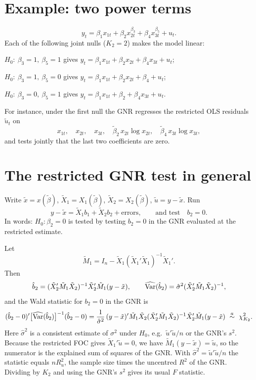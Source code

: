 \documentclass[11pt]{article}
\begin{document}
\section{Example: two power terms}

\[ y_{t}=\beta_{1}x_{1t}+\beta_{2}x_{2t}^{\beta_{3}}+\beta_{4}x_{3t}^{\beta_{5}}+u_{t}. \]
Each of the following joint nulls ($K_{2}=2$) makes the model linear:
\begin{flatlist}
 \item $H_{0}:\ \beta_{3}=1,\ \beta_{5}=1$ \quad gives\quad
       $y_{t}=\beta_{1}x_{1t}+\beta_{2}x_{2t}+\beta_{4}x_{3t}+u_{t}$;
 \item $H_{0}:\ \beta_{3}=1,\ \beta_{5}=0$ \quad gives\quad
       $y_{t}=\beta_{1}x_{1t}+\beta_{2}x_{2t}+\beta_{4}+u_{t}$;
 \item $H_{0}:\ \beta_{3}=0,\ \beta_{5}=1$ \quad gives\quad
       $y_{t}=\beta_{1}x_{1t}+\beta_{2}+\beta_{4}x_{3t}+u_{t}$.
\end{flatlist}
For instance, under the first null the GNR regresses the restricted OLS
residuals $\tilde u_{t}$ on
\[ x_{1t},\quad x_{2t},\quad x_{3t},\quad
   \tilde\beta_{2}\,x_{2t}\log x_{2t},\quad \tilde\beta_{4}\,x_{3t}\log x_{3t}, \]
and tests jointly that the last two coefficients are zero.

\section{The restricted GNR test in general}\label{sec:general}

Write $\tilde x=x(\tilde\beta)$, $\tilde X_{1}=X_{1}(\tilde\beta)$,
$\tilde X_{2}=X_{2}(\tilde\beta)$, $\tilde u=y-\tilde x$. Run
\[ y-\tilde x=\tilde X_{1}b_{1}+\tilde X_{2}b_{2}+\text{errors},
   \qquad\text{and test}\quad b_{2}=0 . \]
In words: $H_{0}:\beta_{2}=0$ is tested by testing $b_{2}=0$ in the GNR evaluated
at the restricted estimate.

Let
\[ \tilde M_{1}=I_{n}-\tilde X_{1}(\tilde X_{1}'\tilde X_{1})^{-1}\tilde X_{1}'. \]
Then
\[ \hat b_{2}=(\tilde X_{2}'\tilde M_{1}\tilde X_{2})^{-1}\tilde X_{2}'\tilde M_{1}(y-\tilde x),
   \qquad
   \widehat{\operatorname{Var}}(\hat b_{2})=\hat\sigma^{2}(\tilde X_{2}'\tilde M_{1}\tilde X_{2})^{-1}, \]
and the Wald statistic for $b_{2}=0$ in the GNR is
\[ (\hat b_{2}-0)'\bigl[\widehat{\operatorname{Var}}(\hat b_{2})\bigr]^{-1}(\hat b_{2}-0)
   =\frac{1}{\hat\sigma^{2}}\,(y-\tilde x)'\tilde M_{1}\tilde X_{2}
     (\tilde X_{2}'\tilde M_{1}\tilde X_{2})^{-1}\tilde X_{2}'\tilde M_{1}(y-\tilde x)
   \ \overset{a}{\sim}\ \chi^{2}_{K_{2}}. \]
Here $\hat\sigma^{2}$ is a consistent estimate of $\sigma^{2}$ under $H_{0}$, e.g.\
$\tilde u'\tilde u/n$ or the GNR's $s^{2}$. Because the restricted FOC gives
$\tilde X_{1}'\tilde u=0$, we have $\tilde M_{1}(y-\tilde x)=\tilde u$, so the
numerator is the explained sum of squares of the GNR. With
$\hat\sigma^{2}=\tilde u'\tilde u/n$ the statistic equals $nR^{2}_{u}$, the sample
size times the uncentred $R^{2}$ of the GNR. Dividing by $K_{2}$ and using the GNR's
$s^{2}$ gives its usual $F$ statistic.
\end{document}
